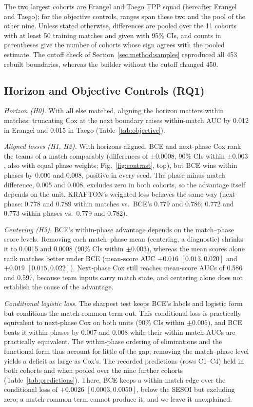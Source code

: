 \documentclass[sigconf,anonymous]{acmart}
\begin{document}
The two largest cohorts are Erangel and Taego TPP squad (hereafter Erangel and Taego); for the objective controls, ranges span these two and the pool of the other nine. Unless stated otherwise, differences are pooled over the 11 cohorts with at least 50 training matches and given with 95\% CIs, and counts in parentheses give the number of cohorts whose sign agrees with the pooled estimate. The cutoff check of Section~\ref{sec:method:samples} reproduced all 453 rebuilt boundaries, whereas the builder without the cutoff changed 450.

\subsection{Horizon and Objective Controls (RQ1)}
\label{sec:results:rq1}
\emph{Horizon (H0).} With all else matched, aligning the horizon matters within matches: truncating Cox at the next boundary raises within-match AUC by 0.012 in Erangel and 0.015 in Taego (Table~\ref{tab:objective}).

\emph{Aligned losses (H1, H2).} With horizons aligned, BCE and next-phase Cox rank the teams of a match comparably (differences of $\pm0.0008$, 90\% CIs within $\pm0.003$, also with equal phase weights; Fig.~\ref{fig:contrast}, top), but BCE wins within phases by 0.006 and 0.008, positive in every seed. The phase-minus-match difference, 0.005 and 0.008, excludes zero in both cohorts, so the advantage itself depends on the unit. KRAFTON's weighted loss behaves the same way (next-phase: 0.778 and 0.789 within matches vs.\ BCE's 0.779 and 0.786; 0.772 and 0.773 within phases vs.\ 0.779 and 0.782).

\emph{Centering (H3).} BCE's within-phase advantage depends on the match--phase score levels. Removing each match--phase mean (centering, a diagnostic) shrinks it to 0.0015 and 0.0008 (90\% CIs within $\pm0.003$), whereas the mean scores alone rank matches better under BCE (mean-score AUC $+0.016$ $[0.013,\allowbreak 0.020]$ and $+0.019$ $[0.015,\allowbreak 0.022]$). Next-phase Cox still reaches mean-score AUCs of 0.586 and 0.597, because team inputs carry match state, and centering alone does not establish the cause of the advantage.

\emph{Conditional logistic loss.} The sharpest test keeps BCE's labels and logistic form but conditions the match-common term out. This conditional loss is practically equivalent to next-phase Cox on both units (90\% CIs within $\pm0.005$), and BCE beats it within phases by 0.007 and 0.008 while their within-match AUCs are practically equivalent. The within-phase ordering of eliminations and the functional form thus account for little of the gap; removing the match--phase level yields a deficit as large as Cox's. The recorded predictions (rows C1--C4) held in both cohorts and when pooled over the nine further cohorts (Table~\ref{tab:predictions}). There, BCE keeps a within-match edge over the conditional loss of $+0.0026$ $[0.0003,\allowbreak 0.0050]$, below the SESOI but excluding zero; a match-common term cannot produce it, and we leave it unexplained.
\end{document}
